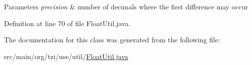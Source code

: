 \begin{DoxyParams}{Parameters}
{\em precision} & number of decimals where the first difference may occur \\
\hline
\end{DoxyParams}


Definition at line 70 of file Float\-Util.\-java.



The documentation for this class was generated from the following file\-:\begin{DoxyCompactItemize}
\item 
src/main/org/tzi/use/util/\hyperlink{_float_util_8java}{Float\-Util.\-java}\end{DoxyCompactItemize}
